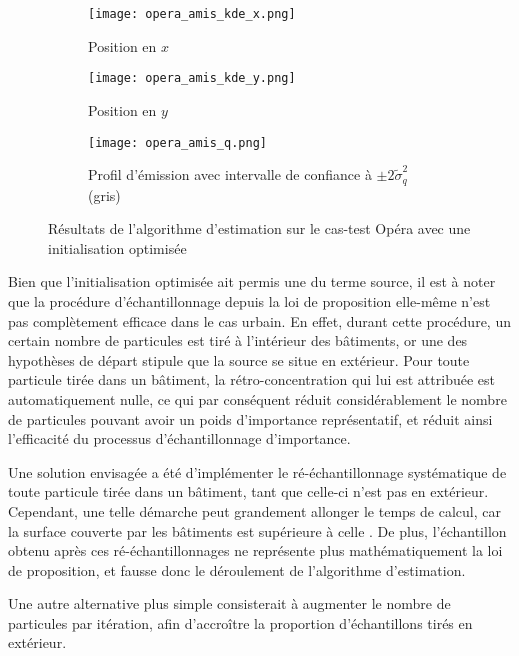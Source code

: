 \begin{figure}[h!]
	\centering
	\begin{subfigure}[t]{0.5\textwidth}
		\centering
		\texttt{[image: opera\_amis\_kde\_x.png]}
		\caption{Position en $x$}
		\label{opera_amis_x}
	\end{subfigure}%
	\begin{subfigure}[t]{0.5\textwidth}
		\centering
		\texttt{[image: opera\_amis\_kde\_y.png]}
		\caption{Position en $y$}
		\label{opera_amis_y}
	\end{subfigure}
	\begin{subfigure}[t]{0.65\textwidth}
		\centering
		\texttt{[image: opera\_amis\_q.png]}
		\caption{Profil d'émission avec intervalle de confiance à  $\pm 2 \widetilde{\sigma}_q^2$ (gris)}
		\label{opera_amis_q}
	\end{subfigure} 
	\caption{Résultats de l'algorithme d'estimation sur le cas-test Opéra avec une initialisation optimisée}
	\label{fig_opera_amis}
\end{figure}

Bien que l'initialisation optimisée ait permis une  du terme source, il est à noter que la procédure d'échantillonnage depuis la loi de proposition elle-même n'est pas complètement efficace dans le cas urbain. En effet, durant cette procédure, un certain nombre de particules est tiré à l'intérieur des bâtiments, or une des hypothèses de départ stipule que la source se situe en extérieur. Pour toute particule tirée dans un bâtiment, la rétro-concentration qui lui est attribuée est automatiquement nulle, ce qui par conséquent réduit considérablement le nombre de particules pouvant avoir un poids d'importance représentatif, et réduit ainsi l'efficacité du processus d'échantillonnage d'importance. 

Une solution envisagée a été d'implémenter le ré-échantillonnage systématique de toute particule tirée dans un bâtiment, tant que celle-ci n'est pas en extérieur. Cependant, une telle démarche peut grandement allonger le temps de calcul, car la surface couverte par les bâtiments est supérieure à celle . De plus, l'échantillon obtenu après ces ré-échantillonnages ne représente plus mathématiquement la loi de proposition, et fausse donc le déroulement de l'algorithme d'estimation. 

Une autre alternative plus simple consisterait à augmenter le nombre de particules par itération, afin d'accroître la proportion d'échantillons tirés en extérieur. \\

